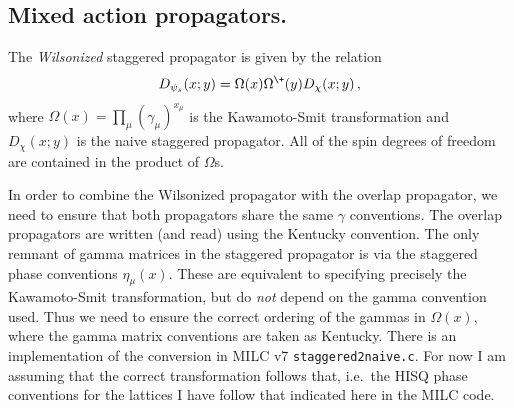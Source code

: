 \documentclass[11pt,a4paper]{article}
\newcommand{\ROOT}[0]{/Users/atlytle/Dropbox/Tex_docs}
\begin{document}
\subsection{Mixed action propagators.}
The \emph{Wilsonized} staggered propagator is given by the relation
\begin{equation}
D_{\psi_s}(x;y) = \Omega(x) \Omega^{\+}(y) D_{\chi}(x;y) \,,
\end{equation}
where $\Omega(x) = \prod_{\mu} (\gamma_\mu)^{x_\mu}$ is the Kawamoto-Smit transformation
and $D_{\chi}(x;y)$ is the naive staggered propagator.
All of the spin degrees of freedom are contained in the product of $\Omega$s.

In order to combine the Wilsonized propagator with the overlap propagator,
we need to ensure that both propagators share the same $\gamma$ conventions.
The overlap propagators are written (and read) using the Kentucky convention.
The only remnant of gamma matrices in the staggered propagator is via the staggered
phase conventions $\eta_\mu(x)$.  
These are equivalent to specifying precisely the Kawamoto-Smit transformation,
but do \emph{not} depend on the gamma convention used.  
Thus we need to ensure the correct ordering of the gammas in $\Omega(x)$,
 where the gamma matrix conventions are taken as Kentucky.
 There is an implementation of the conversion in MILC v7 {\tt staggered2naive.c}.
 For now I am assuming that the correct transformation follows that, 
 i.e.\ the HISQ phase conventions for the lattices I have follow that indicated here in the MILC code.




\end{document}

